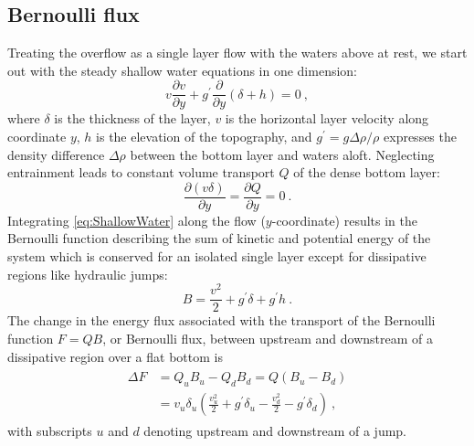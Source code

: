\documentclass{ametsocV6.1}
\providecommand{\DIFaddbegin}{} %
\providecommand{\DIFaddend}{} %
\providecommand{\DIFdelbegin}{} %
\providecommand{\DIFdelend}{} %
\begin{document}
\subsection{Bernoulli flux}\label{sec:Bernoulli}
Treating the overflow as a single layer flow with the waters above at rest, we start out with the steady shallow water equations in one dimension:
\begin{equation}
    v \frac{\partial v}{\partial y} + g^\prime \frac{\partial}{\partial y} (\delta + h) = 0\ ,
    \label{eq:ShallowWater}
\end{equation}
where $\delta$ is the thickness of the layer, $v$ is the horizontal layer velocity along coordinate $y$, $h$ is the elevation of the topography, and $g^\prime=g \Delta \rho / \rho$ expresses the density difference $\Delta \rho$ between the bottom layer and waters aloft.
Neglecting entrainment leads to constant volume transport $Q$ of the dense bottom layer:
\begin{equation}
\frac{\partial (v \delta)}{\partial y} = \frac{\partial Q}{\partial y} = 0\ .
\end{equation}
Integrating \eqref{eq:ShallowWater} along the flow ($y$-coordinate) results in the Bernoulli function describing the sum of kinetic and potential energy of the system which is conserved for an isolated single layer except for dissipative regions like hydraulic jumps:
\begin{equation}
    B = \frac{v^2}{2} + g^\prime \delta + g^\prime h\ .
\end{equation}
The change in the energy flux associated with the transport of the Bernoulli function $F=Q B$, or Bernoulli flux, between upstream and downstream of a dissipative region over a flat bottom is
\begin{align}
\DIFdelbegin %
\DIFdelend \DIFaddbegin \begin{split}
\Delta F &= Q_u B_u -Q_d B_d = Q(B_u - B_d) \\
    &= v_u \delta_u (\frac{v_u^2}{2} + g^\prime \delta_u - \frac{v_d^2}{2} -g^\prime \delta_d)\ ,
\end{split}\DIFaddend 
\label{eq:BernoulliNoEntrainment}
\end{align}
with subscripts $u$ and $d$ denoting upstream and downstream of a jump.
\end{document}
